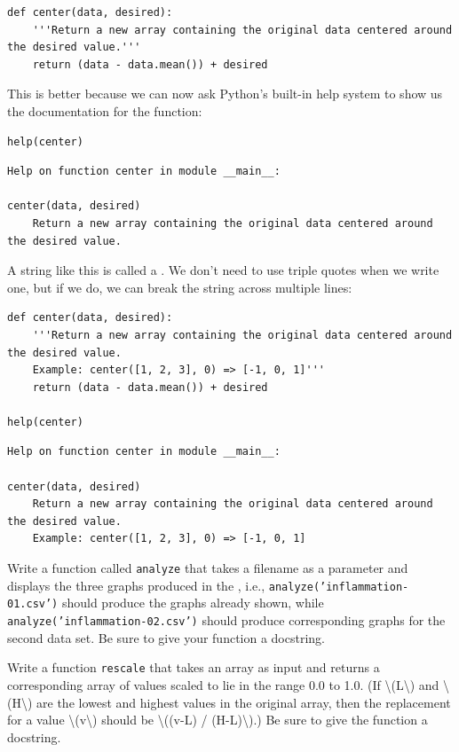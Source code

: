 \documentclass{book}
\begin{document}
\begin{verbatim}
def center(data, desired):
    '''Return a new array containing the original data centered around the desired value.'''
    return (data - data.mean()) + desired
\end{verbatim}

This is better because we can now ask Python's built-in help system to
show us the documentation for the function:

\begin{verbatim}
help(center)
\end{verbatim}

\begin{verbatim}
Help on function center in module __main__:

center(data, desired)
    Return a new array containing the original data centered around the desired value.
\end{verbatim}

A string like this is called a . We
don't need to use triple quotes when we write one, but if we do, we can
break the string across multiple lines:

\begin{verbatim}
def center(data, desired):
    '''Return a new array containing the original data centered around the desired value.
    Example: center([1, 2, 3], 0) => [-1, 0, 1]'''
    return (data - data.mean()) + desired

help(center)
\end{verbatim}

\begin{verbatim}
Help on function center in module __main__:

center(data, desired)
    Return a new array containing the original data centered around the desired value.
    Example: center([1, 2, 3], 0) => [-1, 0, 1]
\end{verbatim}

\begin{challenge}
  Write a function called \texttt{analyze} that takes a filename as a
  parameter and displays the three graphs produced in the
  , i.e.,
  \texttt{analyze('inflammation-01.csv')} should produce the graphs
  already shown, while \texttt{analyze('inflammation-02.csv')} should
  produce corresponding graphs for the second data set. Be sure to give
  your function a docstring.
\end{challenge}

\begin{challenge}
  Write a function \texttt{rescale} that takes an array as input and
  returns a corresponding array of values scaled to lie in the range 0.0
  to 1.0. (If \textbackslash{}(L\textbackslash{}) and
  \textbackslash{}(H\textbackslash{}) are the lowest and highest values
  in the original array, then the replacement for a value
  \textbackslash{}(v\textbackslash{}) should be \textbackslash{}((v-L) /
  (H-L)\textbackslash{}).) Be sure to give the function a docstring.
\end{challenge}
\end{document}

